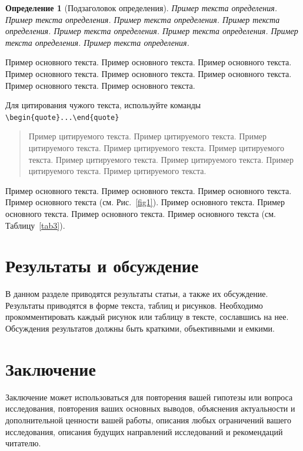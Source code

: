 \documentclass[pdflatex,sn-mathphys-gost]{pmi-jnl}
\newtheorem{definition}{Определение}%
\begin{document}
\begin{definition}[Подзаголовок определения]
Пример текста определения. Пример текста определения. Пример текста определения. Пример текста определения. Пример текста определения. Пример текста определения. Пример текста определения. Пример текста определения. 
\end{definition}

Пример основного текста. Пример основного текста. Пример основного текста. Пример основного текста. Пример основного текста. Пример основного текста. Пример основного текста. Пример основного текста.

Для цитирования чужого текста, используйте команды \verb+\begin{quote}...\end{quote}+
\begin{quote}
Пример цитируемого текста. Пример цитируемого текста. Пример цитируемого текста. Пример цитируемого текста. Пример цитируемого текста. Пример цитируемого текста. Пример цитируемого текста. Пример цитируемого текста. Пример цитируемого текста. 
\end{quote}

Пример основного текста. Пример основного текста. Пример основного текста. Пример основного текста (см. Рис.~\ref{fig1}). Пример основного текста. Пример основного текста. Пример основного текста. Пример основного текста (см. Таблицу~\ref{tab3}).

\section{Результаты и обсуждение}\label{sec12}

В данном разделе приводятся результаты статьи, а также их обсуждение.
Результаты приводятся в форме текста, таблиц и рисунков. Необходимо прокомментировать каждый рисунок или таблицу в тексте, сославшись на нее. Обсуждения результатов должны быть краткими, объективными и емкими.

\section{Заключение}\label{sec13}

Заключение может использоваться для повторения вашей гипотезы или вопроса исследования, повторения ваших основных выводов, объяснения актуальности и дополнительной ценности вашей работы, описания любых ограничений вашего исследования, описания будущих направлений исследований и рекомендаций читателю.
\end{document}
